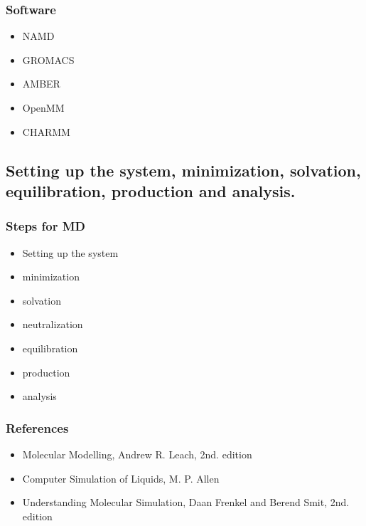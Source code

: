 \documentclass{beamer}
\begin{document}
\begin{frame}[fragile]
\frametitle{Software}

\begin{itemize}
\item NAMD
\item GROMACS
\item AMBER
\item OpenMM
\item CHARMM
\end{itemize}


\end{frame}

\subsection{Setting up the system, minimization, solvation, equilibration, production and analysis.}


\begin{frame}
\frametitle{Steps for MD}

\begin{itemize}
\item Setting up the system
\item minimization
\item solvation
\item neutralization
\item equilibration
\item production 
\item analysis
\end{itemize}

\end{frame}

\begin{frame}
\frametitle{References}
\begin{itemize}
	\item Molecular Modelling, Andrew R. Leach, 2nd. edition
	\item Computer Simulation of Liquids, M. P. Allen
	\item Understanding Molecular Simulation, Daan Frenkel and Berend Smit, 2nd. edition
\end{itemize}
\end{frame}
\end{document}
